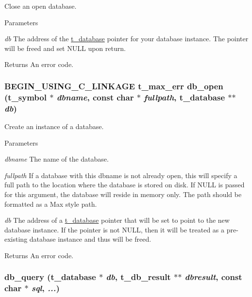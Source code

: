 Close an open database. 
\begin{DoxyParams}{Parameters}
\item[{\em db}]The address of the \hyperlink{group__database_gad832ea0e5fc292661fd20046cee7e3b3}{t\_\-database} pointer for your database instance. The pointer will be freed and set NULL upon return. \end{DoxyParams}
\begin{DoxyReturn}{Returns}
An error code. 
\end{DoxyReturn}
\hypertarget{group__database_gac709a497fcc55817c1c9292bd59eb03f}{
\subsubsection[{db\_\-open}]{\setlength{\rightskip}{0pt plus 5cm}BEGIN\_\-USING\_\-C\_\-LINKAGE {\bf t\_\-max\_\-err} db\_\-open ({\bf t\_\-symbol} $\ast$ {\em dbname}, \/  const char $\ast$ {\em fullpath}, \/  {\bf t\_\-database} $\ast$$\ast$ {\em db})}}
\label{group__database_gac709a497fcc55817c1c9292bd59eb03f}


Create an instance of a database. 
\begin{DoxyParams}{Parameters}
\item[{\em dbname}]The name of the database. \item[{\em fullpath}]If a database with this dbname is not already open, this will specify a full path to the location where the database is stored on disk. If NULL is passed for this argument, the database will reside in memory only. The path should be formatted as a Max style path. \item[{\em db}]The address of a \hyperlink{group__database_gad832ea0e5fc292661fd20046cee7e3b3}{t\_\-database} pointer that will be set to point to the new database instance. If the pointer is not NULL, then it will be treated as a pre-\/existing database instance and thus will be freed. \end{DoxyParams}
\begin{DoxyReturn}{Returns}
An error code. 
\end{DoxyReturn}
\hypertarget{group__database_ga70fac948e0a17e91d80c064765d5d016}{
\subsubsection[{db\_\-query}]{ db\_\-query ({\bf t\_\-database} $\ast$ {\em db}, \/  {\bf t\_\-db\_\-result} $\ast$$\ast$ {\em dbresult}, \/  const char $\ast$ {\em sql}, \/   {\em ...})}}
\label{group__database_ga70fac948e0a17e91d80c064765d5d016}


